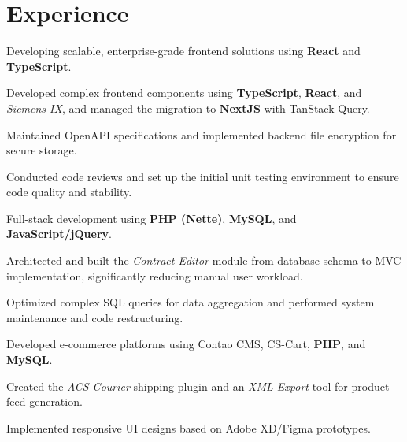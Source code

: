 \documentclass[]{deedy-resume-reversed}
\begin{document}
\begin{minipage}[t]{0.65\textwidth}


\section{Experience}
\vspace{\topsep}
\begin{tightemize}
\item Developing scalable, enterprise-grade frontend solutions using \textbf{React} and \textbf{TypeScript}.
\end{tightemize}

\sectionsep
{}
\begin{tightemize}
\item Developed complex frontend components using \textbf{TypeScript}, \textbf{React}, and \emph{Siemens IX}, and managed the migration to \textbf{NextJS} with TanStack Query.
\item Maintained OpenAPI specifications and implemented backend file encryption for secure storage.
\item Conducted code reviews and set up the initial unit testing environment to ensure code quality and stability.
\end{tightemize}
\sectionsep

\begin{tightemize}
\item Full-stack development using \textbf{PHP (Nette)}, \textbf{MySQL}, and \textbf{JavaScript/jQuery}.
\item Architected and built the \emph{Contract Editor} module from database schema to MVC implementation, significantly reducing manual user workload.
\item Optimized complex SQL queries for data aggregation and performed system maintenance and code restructuring.
\end{tightemize}
\sectionsep

\begin{tightemize}
\item Developed e-commerce platforms using Contao CMS, CS-Cart, \textbf{PHP}, and \textbf{MySQL}.
\item Created the \emph{ACS Courier} shipping plugin and an \emph{XML Export} tool for product feed generation.
\item Implemented responsive UI designs based on Adobe XD/Figma prototypes.
\end{tightemize}
\sectionsep


\end{minipage}
\end{document}
